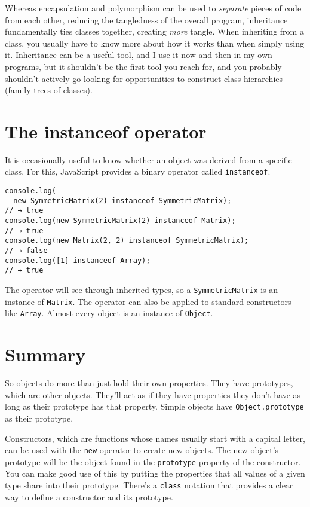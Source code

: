 Whereas encapsulation and polymorphism can be used to \emph{separate} pieces of code from each other, reducing the tangledness of the overall program, inheritance fundamentally ties classes together, creating \emph{more} tangle. When inheriting from a class, you usually have to know more about how it works than when simply using it. Inheritance can be a useful tool, and I use it now and then in my own programs, but it shouldn't be the first tool you reach for, and you probably shouldn't actively go looking for opportunities to construct class hierarchies (family trees of classes).

\section{The instanceof operator}

It is occasionally useful to know whether an object was derived from a specific class. For this, JavaScript provides a binary operator called \lstinline`instanceof`.

\begin{lstlisting}
console.log(
  new SymmetricMatrix(2) instanceof SymmetricMatrix);
// → true
console.log(new SymmetricMatrix(2) instanceof Matrix);
// → true
console.log(new Matrix(2, 2) instanceof SymmetricMatrix);
// → false
console.log([1] instanceof Array);
// → true
\end{lstlisting}
\noindent{}

The operator will see through inherited types, so a \lstinline`SymmetricMatrix` is an instance of \lstinline`Matrix`. The operator can also be applied to standard constructors like \lstinline`Array`. Almost every object is an instance of \lstinline`Object`.

\section{Summary}

So objects do more than just hold their own properties. They have prototypes, which are other objects. They'll act as if they have properties they don't have as long as their prototype has that property. Simple objects have \lstinline`Object.prototype` as their prototype.

Constructors, which are functions whose names usually start with a capital letter, can be used with the \lstinline`new` operator to create new objects. The new object's prototype will be the object found in the \lstinline`prototype` property of the constructor. You can make good use of this by putting the properties that all values of a given type share into their prototype. There's a \lstinline`class` notation that provides a clear way to define a constructor and its prototype.

